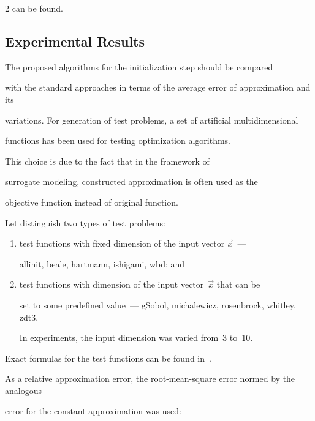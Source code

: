 \begin{multicols}{2}
can be found.



\subsection{Experimental Results}

\label{exp1}



\noindent

The proposed algorithms for the initialization step should be compared 

with the standard approaches in terms of the average error of approximation and its 

variations. For generation of test problems, a set of artificial multidimensional 

functions has been used for testing optimization algorithms.

This choice is due to the fact that in the framework of 

surrogate modeling, constructed approximation is often used as the 

objective function instead of original function.

Let distinguish two types of test problems:

\begin{enumerate}[(1)]

  \item test functions with fixed dimension of the input vector $\vec x$~--- 

  allinit, beale, hartmann, ishigami, wbd; and

  \item test functions with dimension of the input vector~$\vec x$ that can be 

  set to some predefined value~--- gSobol, michalewicz, rosenbrock, whitley, zdt3. 

  In experiments, the input dimension was varied from~3 to~10.

\end{enumerate}

Exact formulas for the test functions can be found in~\cite{data1, data2}.



As a relative approximation error, the root-mean-square error normed by the analogous 

error for the constant approximation was used:

\begin{equation}


\end{equation}
\end{multicols}
